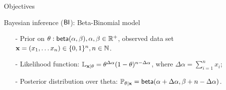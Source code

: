 \documentclass[final,hyperref={pdfpagelabels=false}]{beamer}
\begin{document}
\begin{frame}[t]
\begin{columns}[t]
\begin{column}{.485\textwidth}
\begin{block}{Objectives}

\end{block}

            
\begin{block}{Bayesian inference ($\mathsf{BI}$): Beta-Binomial model}
\begin{itemize}
  \item[-] Prior on $\theta: \mathsf{beta}(\alpha, \beta), \alpha,\beta\in\mathbb{R}^{+}$, observed data set $\textbf{x}= (x_1,\dots x_n)\in\{0,1\}^{n}, n\in\mathbb{N}$.

  \item[-] Likelihood function: $\mathbb{L}_{\textbf{x} | \theta}= \theta^{\Delta \alpha}(1-\theta)^{n - \Delta \alpha}$, where $\Delta \alpha = \displaystyle\sum_{i=1}^{n}x_i$;

  \item[-] Posterior distribution over theta: $\mathbb{P}_{\theta|\textbf{x}}=\mathsf{beta}(\alpha + \Delta \alpha,\beta + n - \Delta \alpha)$.
\end{itemize}
\end{block}



\end{column}
\end{columns}
\end{frame}
\end{document}
